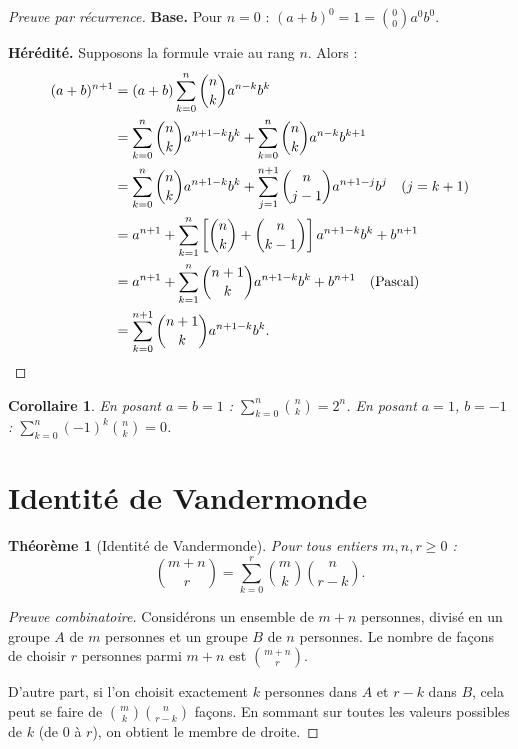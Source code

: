 \documentclass[12pt,a4paper,openany]{book}
\theoremstyle{definition}
\theoremstyle{plain}
\newtheorem{theoreme}[definition]{Théorème}
\newtheorem{corollaire}[definition]{Corollaire}
\theoremstyle{remark}
\begin{document}
\begin{proof}[Preuve par récurrence]
\textbf{Base.} Pour $n=0$ : $(a+b)^0 = 1 = \binom{0}{0} a^0 b^0$. \checkmark

\textbf{Hérédité.} Supposons la formule vraie au rang $n$. Alors :
\begin{align*}
  (a+b)^{n+1}
  &= (a+b)\sum_{k=0}^{n}\binom{n}{k}a^{n-k}b^k \\
  &= \sum_{k=0}^{n}\binom{n}{k}a^{n+1-k}b^k
     + \sum_{k=0}^{n}\binom{n}{k}a^{n-k}b^{k+1} \\
  &= \sum_{k=0}^{n}\binom{n}{k}a^{n+1-k}b^k
     + \sum_{j=1}^{n+1}\binom{n}{j-1}a^{n+1-j}b^{j}
     \quad (j = k+1) \\
  &= a^{n+1} + \sum_{k=1}^{n}\left[\binom{n}{k}+\binom{n}{k-1}\right]a^{n+1-k}b^k + b^{n+1} \\
  &= a^{n+1} + \sum_{k=1}^{n}\binom{n+1}{k}a^{n+1-k}b^k + b^{n+1}
     \quad \text{(Pascal)} \\
  &= \sum_{k=0}^{n+1}\binom{n+1}{k}a^{n+1-k}b^k. \qedhere
\end{align*}
\end{proof}

\begin{corollaire}\label{cor:somme-binom}
En posant $a = b = 1$ :
$\displaystyle\sum_{k=0}^{n}\binom{n}{k} = 2^n$.
En posant $a=1$, $b=-1$ :
$\displaystyle\sum_{k=0}^{n}(-1)^k\binom{n}{k} = 0$.
\end{corollaire}

\section{Identité de Vandermonde}\label{sec:vandermonde}

\begin{theoreme}[Identité de Vandermonde]\label{thm:vandermonde}
Pour tous entiers $m, n, r \geq 0$ :
\[
  \binom{m+n}{r} = \sum_{k=0}^{r} \binom{m}{k}\binom{n}{r-k}.
\]
\end{theoreme}

\begin{proof}[Preuve combinatoire]
Considérons un ensemble de $m+n$ personnes, divisé en un groupe $A$ de $m$
personnes et un groupe $B$ de $n$ personnes. Le nombre de façons de choisir
$r$ personnes parmi $m+n$ est $\binom{m+n}{r}$.

D'autre part, si l'on choisit exactement $k$ personnes dans $A$ et $r-k$
dans $B$, cela peut se faire de $\binom{m}{k}\binom{n}{r-k}$ façons. En
sommant sur toutes les valeurs possibles de $k$ (de $0$ à $r$), on obtient
le membre de droite.
\end{proof}
\end{document}
